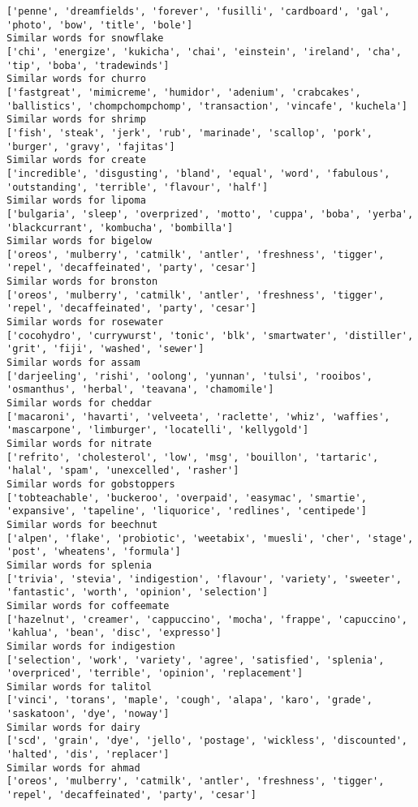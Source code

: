 \documentclass[11pt]{article}
\begin{document}
\begin{Verbatim}[commandchars=\\\{\}]
['penne', 'dreamfields', 'forever', 'fusilli', 'cardboard', 'gal', 'photo', 'bow', 'title', 'bole']
Similar words for snowflake
['chi', 'energize', 'kukicha', 'chai', 'einstein', 'ireland', 'cha', 'tip', 'boba', 'tradewinds']
Similar words for churro
['fastgreat', 'mimicreme', 'humidor', 'adenium', 'crabcakes', 'ballistics', 'chompchompchomp', 'transaction', 'vincafe', 'kuchela']
Similar words for shrimp
['fish', 'steak', 'jerk', 'rub', 'marinade', 'scallop', 'pork', 'burger', 'gravy', 'fajitas']
Similar words for create
['incredible', 'disgusting', 'bland', 'equal', 'word', 'fabulous', 'outstanding', 'terrible', 'flavour', 'half']
Similar words for lipoma
['bulgaria', 'sleep', 'overprized', 'motto', 'cuppa', 'boba', 'yerba', 'blackcurrant', 'kombucha', 'bombilla']
Similar words for bigelow
['oreos', 'mulberry', 'catmilk', 'antler', 'freshness', 'tigger', 'repel', 'decaffeinated', 'party', 'cesar']
Similar words for bronston
['oreos', 'mulberry', 'catmilk', 'antler', 'freshness', 'tigger', 'repel', 'decaffeinated', 'party', 'cesar']
Similar words for rosewater
['cocohydro', 'currywurst', 'tonic', 'blk', 'smartwater', 'distiller', 'grit', 'fiji', 'washed', 'sewer']
Similar words for assam
['darjeeling', 'rishi', 'oolong', 'yunnan', 'tulsi', 'rooibos', 'osmanthus', 'herbal', 'teavana', 'chamomile']
Similar words for cheddar
['macaroni', 'havarti', 'velveeta', 'raclette', 'whiz', 'waffies', 'mascarpone', 'limburger', 'locatelli', 'kellygold']
Similar words for nitrate
['refrito', 'cholesterol', 'low', 'msg', 'bouillon', 'tartaric', 'halal', 'spam', 'unexcelled', 'rasher']
Similar words for gobstoppers
['tobteachable', 'buckeroo', 'overpaid', 'easymac', 'smartie', 'expansive', 'tapeline', 'liquorice', 'redlines', 'centipede']
Similar words for beechnut
['alpen', 'flake', 'probiotic', 'weetabix', 'muesli', 'cher', 'stage', 'post', 'wheatens', 'formula']
Similar words for splenia
['trivia', 'stevia', 'indigestion', 'flavour', 'variety', 'sweeter', 'fantastic', 'worth', 'opinion', 'selection']
Similar words for coffeemate
['hazelnut', 'creamer', 'cappuccino', 'mocha', 'frappe', 'capuccino', 'kahlua', 'bean', 'disc', 'expresso']
Similar words for indigestion
['selection', 'work', 'variety', 'agree', 'satisfied', 'splenia', 'overpriced', 'terrible', 'opinion', 'replacement']
Similar words for talitol
['vinci', 'torans', 'maple', 'cough', 'alapa', 'karo', 'grade', 'saskatoon', 'dye', 'noway']
Similar words for dairy
['scd', 'grain', 'dye', 'jello', 'postage', 'wickless', 'discounted', 'halted', 'dis', 'replacer']
Similar words for ahmad
['oreos', 'mulberry', 'catmilk', 'antler', 'freshness', 'tigger', 'repel', 'decaffeinated', 'party', 'cesar']

\end{Verbatim}
\end{document}
